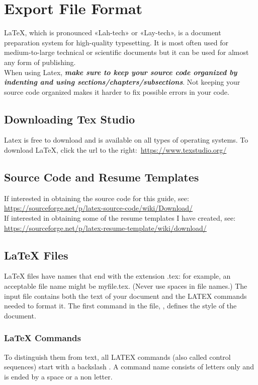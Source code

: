 \section{Export File Format}
\vspace{10.5cm}
	LaTeX, which is pronounced «Lah-tech» or «Lay-tech», is a document preparation system for high-quality typesetting. It is most often used for medium-to-large technical or scientific documents but it can be used for almost any form of publishing.\\
	When using Latex, \textbf{\emph{make sure to keep your source code organized by indenting and using sections/chapters/subsections}}. Not keeping your source code organized makes it harder to fix possible errors in your code.
	\subsection{Downloading Tex Studio}
			Latex is free to download and is available on all types of operating systems. To download \LaTeX, click the url to the right:\, \url{https://www.texstudio.org/}
	\subsection{Source Code and Resume Templates}
			If interested in obtaining the source code for this guide, see:\\
			\url{https://sourceforge.net/p/latex-source-code/wiki/Download/}\\
			If interested in obtaining some of the resume templates I have created, see:\\ \url{https://sourceforge.net/p/latex-resume-template/wiki/download/}
	\subsection{LaTeX Files}
			LaTeX files have names that end with the extension .tex: for example, an acceptable file name might be myfile.tex. (Never use spaces in file names.) The input file contains both the text of your document and the LATEX commands needed to format it. The first command in the file, , defines the style of the document.
	\subsubsection{LaTeX Commands}
			To distinguish them from text, all LATEX commands (also called control sequences) start with a backslash \cs. A command name consists of letters only and is ended by a space or a non letter.
